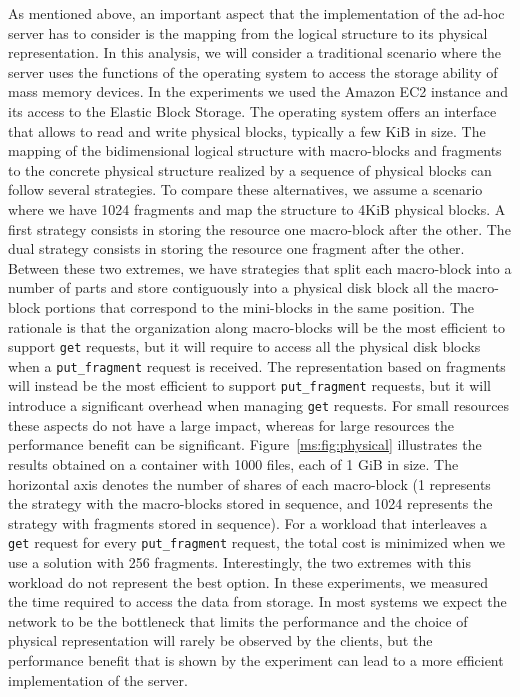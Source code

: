 As mentioned above, an important aspect that the implementation of the ad-hoc server has to consider is the mapping from the logical structure to its physical representation. In this analysis, we will consider a traditional scenario where the server uses the functions of the operating system to access the storage ability of mass memory devices. In the experiments we used the Amazon EC2 instance and its access to the Elastic Block Storage. The operating system offers an interface that allows to read and write physical blocks, typically a few KiB in size. The mapping of the bidimensional logical structure with macro-blocks and fragments to the concrete physical structure realized by a sequence of physical blocks can follow several strategies. To compare these alternatives, we assume a scenario where we have 1024 fragments and map the structure to 4KiB physical blocks. A first strategy consists in storing the resource one macro-block after the other. The dual strategy consists in storing the resource one fragment after the other. Between these two extremes, we have strategies that split each macro-block into a number of parts and store contiguously into a physical disk block all the macro-block portions that correspond to the mini-blocks in the same position. The rationale is that the organization along macro-blocks will be the most efficient to support {\tt get} requests, but it will require to access all the physical disk blocks when a {\tt put\_fragment} request is received. The representation based on fragments will instead be the most efficient to support {\tt put\_fragment} requests, but it will introduce a significant overhead when managing {\tt get} requests. For small resources these aspects do not have a large impact, whereas for large resources the performance benefit can be significant. Figure~\ref{ms:fig:physical} illustrates the results obtained on a container with 1000 files, each of 1 GiB in size. The horizontal axis denotes the number of shares of each macro-block (1 represents the strategy with the macro-blocks stored in sequence, and 1024 represents the strategy with fragments stored in sequence). For a workload that interleaves a {\tt get} request for every {\tt put\_fragment} request, the total cost is minimized when we use a solution with 256 fragments. Interestingly, the two extremes with this workload do not represent the best option. In these experiments, we measured the time required to access the data from storage. In most systems we expect the network to be the bottleneck that limits the performance and the choice of physical representation will rarely be observed by the clients, but the performance benefit that is shown by the experiment can lead to a more efficient implementation of the server.

